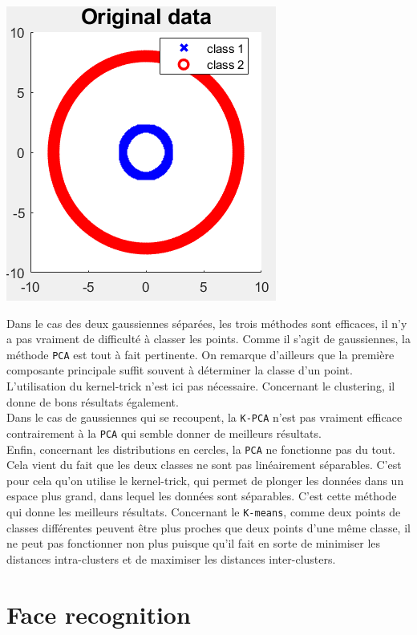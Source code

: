 \documentclass[a4paper, 11pt]{article}
\begin{document}
\begin{center}
	\includegraphics[scale=0.9]{circles_dist.PNG}
\end{center}

Dans le cas des deux gaussiennes séparées, les trois méthodes sont efficaces, il n'y a pas vraiment de difficulté à classer les points. Comme il s'agit de gaussiennes, la méthode \texttt{PCA} est tout à fait pertinente. On remarque d'ailleurs que la première composante principale suffit souvent à déterminer la classe d'un point. L'utilisation du kernel-trick n'est ici pas nécessaire. Concernant le clustering, il donne de bons résultats également. \\

Dans le cas de gaussiennes qui se recoupent, la \texttt{K-PCA} n'est pas vraiment efficace contrairement à la \texttt{PCA} qui semble donner de meilleurs résultats. \\

Enfin, concernant les distributions en cercles, la \texttt{PCA} ne fonctionne pas du tout. Cela vient du fait que les deux classes ne sont pas linéairement séparables. C'est pour cela qu'on utilise le kernel-trick, qui permet de plonger les données dans un espace plus grand, dans lequel les données sont séparables. C'est cette méthode qui donne les meilleurs résultats. Concernant le \texttt{K-means}, comme deux points de classes différentes peuvent être plus proches que deux points d'une même classe, il ne peut pas fonctionner non plus puisque qu'il fait en sorte de minimiser les distances intra-clusters et de maximiser les distances inter-clusters.

\section{Face recognition}
\end{document}
